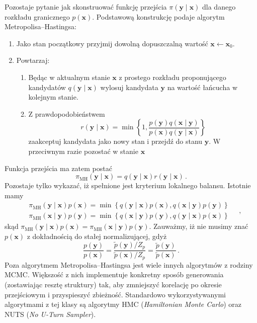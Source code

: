 \documentclass{myclass}
\begin{document}
Pozostaje pytanie jak skonstruować funkcję przejścia \(\pi(\mathbf{y} \mid \mathbf{x})\) dla danego
rozkładu granicznego \(p(\mathbf{x})\). Podstawową konstrukcję podaje algorytm
Metropolisa--Hastingsa:
\begin{enumerate}
    \item Jako stan początkowy przyjmij dowolną dopuszczalną wartość \(\mathbf{x} \leftarrow
    \mathbf{x}_0\).
    \item Powtarzaj:
    \begin{enumerate}
        \item Będąc w aktualnym stanie \(\mathbf{x}\) z prostego rozkładu proponującego kandydatów
        \(q(\mathbf{y} \mid \mathbf{x})\) wylosuj kandydata \(\mathbf{y}\) na wartość łańcucha w
        kolejnym stanie.
        \item Z prawdopodobieństwem
        \begin{equation*}
            r(\mathbf{y} \mid \mathbf{x}) = \min\left\{1, \frac{p(\mathbf{y})q(\mathbf{x} \mid \mathbf{y})}{p(\mathbf{x})q(\mathbf{y} \mid \mathbf{x})}\right\}
        \end{equation*}
        zaakceptuj kandydata jako nowy stan i przejdź do stanu \(\mathbf{y}\). W przeciwnym razie
        pozostać w stanie \(\mathbf{x}\)
    \end{enumerate}
\end{enumerate}
Funkcja przejścia ma zatem postać
\begin{equation*}
    \pi_\text{MH}(\mathbf{y}\mid\mathbf{x}) = q(\mathbf{y} \mid \mathbf{x}) r(\mathbf{y} \mid \mathbf{x})\,.
\end{equation*}
Pozostaje tylko wykazać, iż spełnione jest kryterium lokalnego balansu. Istotnie mamy
\begin{equation*}
    \begin{split}
        &\pi_\text{MH}(\mathbf{y}\mid\mathbf{x})p(\mathbf{x}) = \min\left\{q(\mathbf{y}\mid\mathbf{x})p(\mathbf{x}), q(\mathbf{x}\mid\mathbf{y})p(\mathbf{y})\right\}\\
        &\pi_\text{MH}(\mathbf{x}\mid\mathbf{y})p(\mathbf{y}) = \min\left\{q(\mathbf{x}\mid\mathbf{y})p(\mathbf{y}), q(\mathbf{y}\mid\mathbf{x})p(\mathbf{x})\right\}
    \end{split}\quad,
\end{equation*}
skąd \(\pi_\text{MH}(\mathbf{y}\mid\mathbf{x})p(\mathbf{x}) =
\pi_\text{MH}(\mathbf{x}\mid\mathbf{y})p(\mathbf{y})\). Zauważmy, iż nie musimy znać
\(p(\mathbf{x})\) z dokładnością do stałej normalizującej, gdyż
\begin{equation*}
    \frac{p(\mathbf{y})}{p(\mathbf{x})} = \frac{\tilde{p}(\mathbf{y})/Z_p}{\tilde{p}(\mathbf{x})/Z_p} =  \frac{\tilde{p}(\mathbf{y})}{\tilde{p}(\mathbf{x})}\,.
\end{equation*}
Poza algorytmem Metropolisa--Hastingsa jest wiele innych algorytmów z rodziny MCMC. Większość z nich
implementuje konkretny sposób generowania (zostawiając resztę struktury) tak, aby zmniejszyć
korelację po okresie przejściowym i przyspieszyć zbieżność. Standardowo wykorzystywanymi algorytmami
z tej klasy są algorytmy HMC (\textit{Hamiltonian Monte Carlo}) oraz NUTS (\textit{No U-Turn
Sampler}). 
\end{document}
